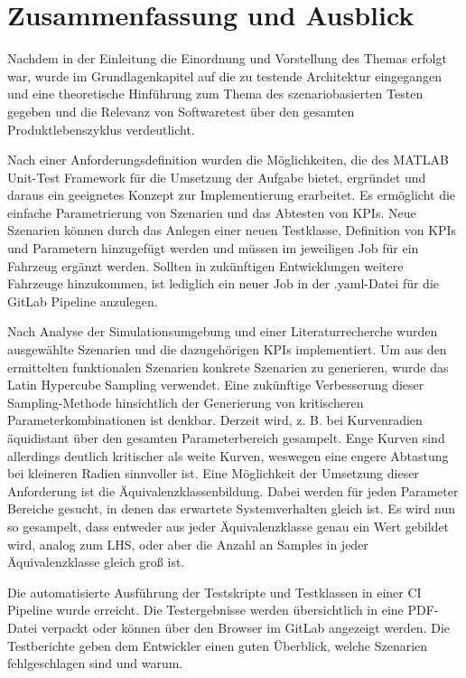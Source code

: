 \chapter{Zusammenfassung und Ausblick} \label{chap:Zusammenfassung}
\thispagestyle{empty}

Nachdem in der Einleitung die Einordnung und Vorstellung des Themas erfolgt war, wurde im Grundlagenkapitel auf die zu testende Architektur eingegangen und eine theoretische Hinführung zum Thema des szenariobasierten Testen gegeben und die Relevanz von Softwaretest über den gesamten Produktlebenszyklus verdeutlicht.

Nach einer Anforderungsdefinition wurden die Möglichkeiten, die des MATLAB\textsuperscript{\textregistered} Unit-Test Framework für die Umsetzung der Aufgabe bietet, ergründet und daraus ein geeignetes Konzept zur Implementierung erarbeitet. Es ermöglicht die einfache Parametrierung von Szenarien und das Abtesten von KPIs. Neue Szenarien können durch das Anlegen einer neuen Testklasse, Definition von KPIs und Parametern hinzugefügt werden und müssen im jeweiligen Job für ein Fahrzeug ergänzt werden. Sollten in zukünftigen Entwicklungen weitere Fahrzeuge hinzukommen, ist lediglich ein neuer Job in der .yaml-Datei für die GitLab Pipeline anzulegen. 

Nach Analyse der Simulationsumgebung und einer Literaturrecherche wurden ausgewählte Szenarien und die dazugehörigen KPIs implementiert. Um aus den ermittelten funktionalen Szenarien konkrete Szenarien zu generieren, wurde das Latin Hypercube Sampling verwendet. Eine zukünftige Verbesserung dieser Sampling-Methode hinsichtlich der Generierung von kritischeren Parameterkombinationen ist denkbar. Derzeit wird, z. B. bei Kurvenradien äquidistant über den gesamten Parameterbereich gesampelt. Enge Kurven sind allerdings deutlich kritischer als weite Kurven, weswegen eine engere Abtastung bei kleineren Radien sinnvoller ist. Eine Möglichkeit der Umsetzung dieser Anforderung ist die Äquivalenzklassenbildung. Dabei werden für jeden Parameter Bereiche gesucht, in denen das erwartete Systemverhalten gleich ist. Es wird nun so gesampelt, dass entweder aus jeder Äquivalenzklasse genau ein Wert gebildet wird, analog zum LHS, oder aber die Anzahl an Samples in jeder Äquivalenzklasse gleich groß ist.

Die automatisierte Ausführung der Testskripte und Testklassen in einer CI Pipeline wurde erreicht. Die Testergebnisse werden übersichtlich in eine PDF-Datei verpackt oder können über den Browser im GitLab angezeigt werden. Die Testberichte geben dem Entwickler einen guten Überblick, welche Szenarien fehlgeschlagen sind und warum.